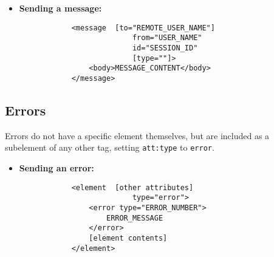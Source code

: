 \begin{itemize}
	\item \textbf{Sending a message:}
		\begin{verbatim}
			<message  [to="REMOTE_USER_NAME"]
				          from="USER_NAME"
				          id="SESSION_ID"
				          [type=""]>
			    <body>MESSAGE_CONTENT</body>
			</message>
		\end{verbatim}
\end{itemize}

\subsection{Errors}

Errors do not have a specific element themselves, but are included as a subelement of any other tag, setting \verb!att:type! to \verb!error!.

\begin{itemize}
	\item \textbf{Sending an error:}
		\begin{verbatim}
			<element  [other attributes]
				          type="error">
			    <error type="ERROR_NUMBER">
			        ERROR_MESSAGE
			    </error>
			    [element contents]
			</element>
		\end{verbatim}
\end{itemize}